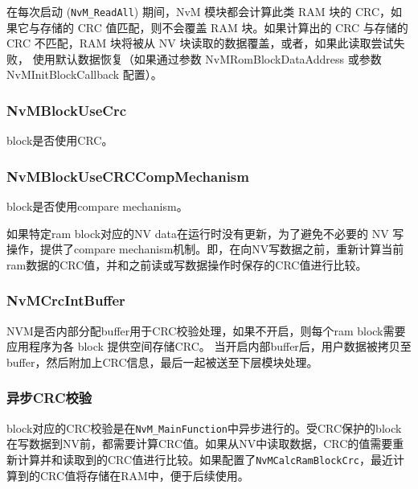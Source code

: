 在每次启动 (\lstinline{NvM_ReadAll}) 期间，NvM 模块都会计算此类 RAM 块的 CRC，如果它与存储的 CRC 值匹配，则不会覆盖 RAM 块。如果计算出的 CRC 与存储的 CRC 不匹配，RAM 块将被从 NV 块读取的数据覆盖，或者，如果此读取尝试失败，
使用默认数据恢复（如果通过参数 NvMRomBlockDataAddress 或参数 NvMInitBlockCallback 配置）。

\subsubsection{NvMBlockUseCrc}
block是否使用CRC。


\subsubsection{NvMBlockUseCRCCompMechanism}

block是否使用compare mechanism。

如果特定ram block对应的NV data在运行时没有更新，为了避免不必要的 NV 写操作，提供了compare
mechanism机制。即，在向NV写数据之前，重新计算当前ram数据的CRC值，并和之前读或写数据操作时保存的CRC值进行比较。

\subsubsection{NvMCrcIntBuffer}

NVM是否内部分配buffer用于CRC校验处理，如果不开启，则每个ram block需要应用程序为各 block 提供空间存储CRC。
当开启内部buffer后，用户数据被拷贝至buffer，然后附加上CRC信息，最后一起被送至下层模块处理。


\subsubsection{异步CRC校验}

block对应的CRC校验是在\lstinline{NvM_MainFunction}中异步进行的。受CRC保护的block在写数据到NV前，都需要计算CRC值。如果从NV中读取数据，CRC的值需要重新计算并和读取到的CRC值进行比较。如果配置了\lstinline{NvMCalcRamBlockCrc}，最近计算到的CRC值将存储在RAM中，便于后续使用。

